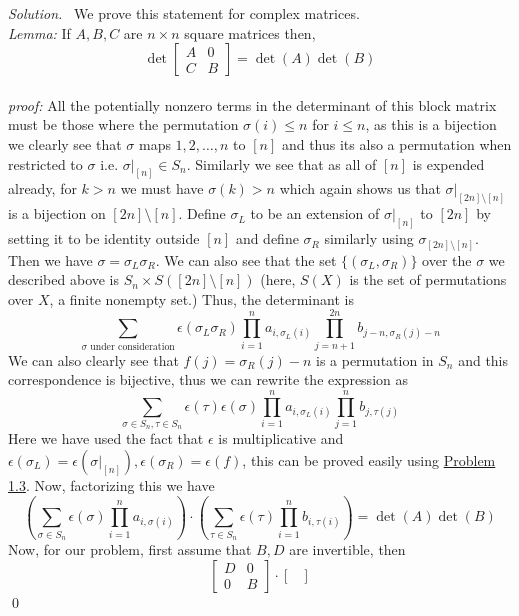 \documentclass[12pt,a4paper]{article}
\newenvironment{solution}{%
  \par\noindent\textit{Solution.}\ }{\qed}
\theoremstyle{problemstyle}
\def\sgn{\epsilon}
\def\sgn{\epsilon}
\begin{document}
\begin{solution}
    We prove this statement for complex matrices.
    \\ \textit{Lemma: } If $A,B,C$ are $n\times n$ square matrices then,
    $$\det\begin{bmatrix}
    A & 0 \\ C & B
    \end{bmatrix}=\det(A)\det(B)$$ 
    \\ \textit{proof: } All the potentially nonzero terms in the determinant of this block matrix must be those where the permutation $\sigma(i)\leq n$ for $i\leq n$, as this is a bijection we clearly see that $\sigma$ maps $1,2,\ldots,n$ to $[n]$ and thus its also a permutation when restricted to $\sigma$ i.e. $\sigma|_{[n]}\in S_n$. 
    Similarly we see that as all of $[n]$ is expended already, for $k>n$ we must have $\sigma(k)>n$ which again shows us that $\sigma|_{[2n]\setminus[n]}$ is a bijection on $[2n]\setminus[n]$. 
    Define $\sigma_{L}$ to be an extension of $\sigma|_{[n]}$ to $[2n]$ by setting it to be identity outside $[n]$ and define $\sigma_R$ similarly using $\sigma_{[2n]\setminus[n]}$. 
    Then we have $\sigma=\sigma_L\sigma_R$. 
    We can also see that the set $\{(\sigma_L,\sigma_R)\}$ over the $\sigma$ we described above is $S_n\times S([2n]\setminus[n])$ (here, $S(X)$ is the set of permutations over $X$, a finite nonempty set.) 
    Thus, the determinant is
    $$\sum_{\sigma\text{ under consideration}}\sgn(\sigma_L\sigma_R)\prod_{i=1}^na_{i,\sigma_L(i)}\prod_{j=n+1}^{2n}b_{j-n,\sigma_R(j)-n}
    $$
    We can also clearly see that $f(j)=\sigma_R(j)-n$ is a permutation in $S_n$ and this correspondence is bijective, thus we can rewrite the expression as
    $$\sum_{\sigma\in S_n,\tau\in S_n}\sgn(\tau)\sgn(\sigma)\prod_{i=1}^na_{i,\sigma_L(i)}\prod_{j=1}^{n}b_{j,\tau(j)}$$ 
    Here we have used the fact that $\epsilon$ is multiplicative and $\epsilon(\sigma_L)=\epsilon(\sigma|_{[n]}),\epsilon(\sigma_R)=\epsilon(f)$, this can be proved easily using \hyperref[prob:1.3]{Problem 1.3}. 
    Now, factorizing this we have
    $$\left(\sum_{\sigma\in S_n}\epsilon(\sigma)\prod_{i=1}^na_{i,\sigma(i)}\right)\cdot\left(\sum_{\tau\in S_n}\epsilon(\tau)\prod_{i=1}^nb_{i,\tau(i)}\right)=\det(A)\det(B)$$
    Now, for our problem, first assume that $B,D$ are invertible, then
    $$\begin{bmatrix}
    D & 0 \\ 0 & B
    \end{bmatrix}\cdot\begin{bmatrix}

\end{bmatrix}$$
\end{solution}
\end{document}
